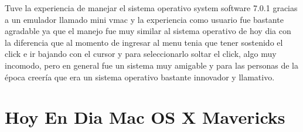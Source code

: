 Tuve la experiencia de manejar el sistema operativo system software 7.0.1 gracias a un emulador llamado mini vmac y la experiencia como usuario fue bastante agradable ya que el manejo fue muy similar al sistema operativo de hoy dia con la diferencia que al momento de ingresar al menu tenia que tener sostenido el click e ir bajando con el cursor y para seleccionarlo soltar el click, algo muy incomodo, pero en general fue un sistema muy amigable y para las personas de la época creería que era un sistema operativo bastante innovador y llamativo.

\section*{Hoy En Dia Mac OS X Mavericks}
